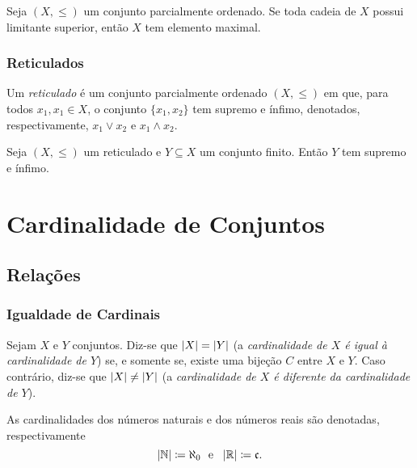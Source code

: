 \begin{lema}
	Seja $(X,\leq)$ um conjunto parcialmente ordenado. Se toda cadeia de $X$ possui limitante superior, então $X$ tem elemento maximal.
\end{lema}

\subsection{Reticulados}

\begin{defi}
	Um \emph{reticulado} é um conjunto parcialmente ordenado $(X,\leq)$ em que, para todos $x_1, x_1 \in X$, o conjunto $\{x_1,x_2\}$ tem supremo e ínfimo, denotados, respectivamente, $x_1 \vee x_2$ e $x_1 \wedge x_2$.
\end{defi}

\begin{prop}
	Seja $(X,\leq)$ um reticulado e $Y \subseteq X$ um conjunto finito. Então $Y$ tem supremo e ínfimo.
\end{prop}













\chapter{Cardinalidade de Conjuntos}

\section{Relações}

\subsection{Igualdade de Cardinais}

\begin{defi}
	Sejam $X$ e $Y$ conjuntos. Diz-se que $\left\vert{X}\right\vert = \left\vert{Y}\right\vert$ (a \emph{cardinalidade de $X$ é igual à cardinalidade de $Y$}) se, e somente se, existe uma bijeção $C$ entre $X$ e $Y$. Caso contrário, diz-se que $\left\vert{X}\right\vert \neq \left\vert{Y}\right\vert$ (a \emph{cardinalidade de $X$ é diferente da cardinalidade de $Y$}).

	As cardinalidades dos números naturais e dos números reais são denotadas, respectivamente
	\begin{equation*}
	\card{\N} \coloneqq \aleph_0 \e \card{\R} \coloneqq \mathfrak c.
	\end{equation*}
\end{defi}

